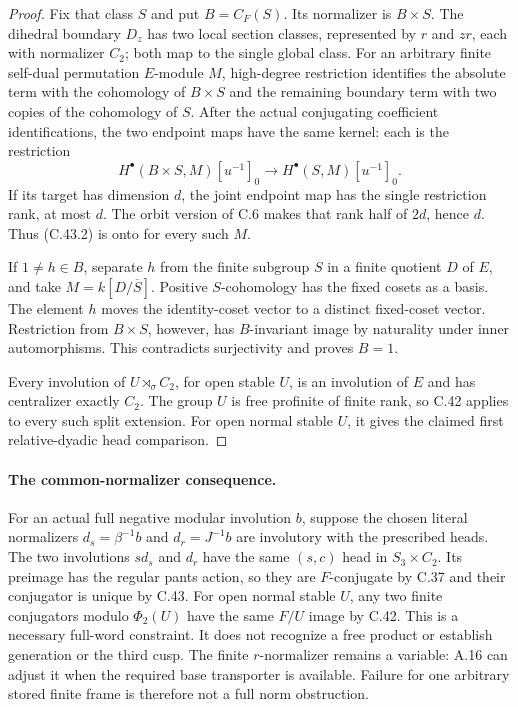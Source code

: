 \begin{proof}
Fix that class $S$ and put $B=C_F(S)$. Its normalizer is
$B\times S$. The dihedral boundary $D_z$ has two local section
classes, represented by $r$ and $zr$, each with normalizer $C_2$;
both map to the single global class. For an arbitrary finite
self-dual permutation $E$-module $M$, high-degree restriction
identifies the absolute term with the cohomology of $B\times S$
and the remaining boundary term with two copies of the cohomology
of $S$. After the actual conjugating coefficient identifications,
the two endpoint maps have the same kernel: each is the restriction
\[
 H^\bullet(B\times S,M)[u^{-1}]_0
       \longrightarrow H^\bullet(S,M)[u^{-1}]_0.                 \tag{C.43.2}
\]
If its target has dimension $d$, the joint endpoint map has the
single restriction rank, at most $d$. The orbit version of C.6
makes that rank half of $2d$, hence $d$. Thus (C.43.2) is onto
for every such $M$.

If $1\ne h\in B$, separate $h$ from the finite subgroup $S$
in a finite quotient $D$ of $E$, and take
$M=k[D/\overline S]$. Positive $S$-cohomology has the fixed cosets
as a basis. The element $h$ moves the identity-coset vector to a
distinct fixed-coset vector. Restriction from $B\times S$, however,
has $B$-invariant image by naturality under inner automorphisms.
This contradicts surjectivity and proves $B=1$.

Every involution of $U\rtimes_\sigma C_2$, for open stable $U$,
is an involution of $E$ and has centralizer exactly $C_2$.
The group $U$ is free profinite of finite rank, so C.42 applies
to every such split extension. For open normal stable $U$, it gives
the claimed first relative-dyadic head comparison.
\end{proof}

\paragraph{The common-normalizer consequence.}
For an actual full negative modular involution $b$, suppose the
chosen literal normalizers $d_s=\beta^{-1}b$ and $d_r=J^{-1}b$
are involutory with the prescribed heads. The two involutions
$sd_s$ and $d_r$ have the same $(s,c)$ head in $S_3\times C_2$.
Its preimage has the regular pants action, so they are $F$-conjugate
by C.37 and their conjugator is unique by C.43. For open normal
stable $U$, any two finite conjugators modulo $\Phi_2(U)$ have
the same $F/U$ image by C.42. This is a necessary full-word
constraint. It does not recognize a free product or establish
generation or the third cusp. The finite $r$-normalizer remains a
variable: A.16 can adjust it when the required base transporter is
available. Failure for one arbitrary stored finite frame is
therefore not a full norm obstruction.


